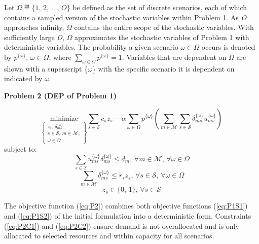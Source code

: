 \documentclass[onecolumn,draftcls]{IEEEtran}
\begin{document}
Let $ \Omega \eqdef \{1,\, 2,\, \ldots,\, O\} $ be defined as the set of discrete scenarios, each of which contains a sampled version of the stochastic variables within Problem 1.  As \textit{O} approaches infinity, $\Omega$ contains the entire scope of the stochastic variables.  With sufficiently large \textit{O}, $\Omega$ approximates the stochastic variables of Problem 1 with deterministic variables.  The probability a given scenario $\omega \in \Omega$ occurs is denoted by $p^{\{\omega\}},\, \omega \in \Omega$, where $\sum_{\omega \in \Omega} p^{\{\omega\}} = 1$.  Variables that are dependent on $\Omega$ are shown with a superscript \{$\omega$\} with the specific scenario it is dependent on indicated by $\omega$.

\vspace{5mm}
\noindent \textbf{Problem 2 (DEP of Problem 1)}



\begin{equation} \label{eq:P2}
\underset{\left\{ \substack{
	z_s,\, \delta_{ms}^{\{\omega\}},\\
	s \in \mathcal{S},\, m \in \mathcal{M},\\
	\omega \in \Omega} \right\}} {\text{minimize}}
\sum_{s \in \mathcal{S}} c_s z_s - \alpha \sum_{\omega \in \Omega} p^{\{\omega\}} \left( \sum_{m \in \mathcal{M}} \sum_{s \in \mathcal{S}} \delta_{ms}^{\{\omega\}} u_{ms}^{\{\omega\}} \right)
\end{equation}
subject to:
\begin{equation} \label{eq:P2C1}
\sum_{s \in \mathcal{S}} u_{ms}^{\{\omega\}} \delta_{ms}^{\{\omega\}} \leq d_m,\, \forall m \in \mathcal{M},\, \forall \omega \in \Omega
\end{equation}
\begin{equation} \label{eq:P2C2}
\sum_{m \in \mathcal{M}} \delta_{ms}^{\{\omega\}} \leq r_s z_s,\, \forall s \in \mathcal{S},\, \forall \omega \in \Omega
\end{equation}
\begin{equation} \label{eq:P2C3}
z_s \in \{0,\, 1\},\, \forall s \in \mathcal{S}
\end{equation}

The objective function (\ref{eq:P2}) combines both objective functions (\ref{eq:P1S1}) and (\ref{eq:P1S2}) of the initial formulation into a deterministic form.  Constraints (\ref{eq:P2C1}) and (\ref{eq:P2C2})	ensure demand is not overallocated and is only allocated to selected resources and within capacity for all scenarios.
\end{document}
